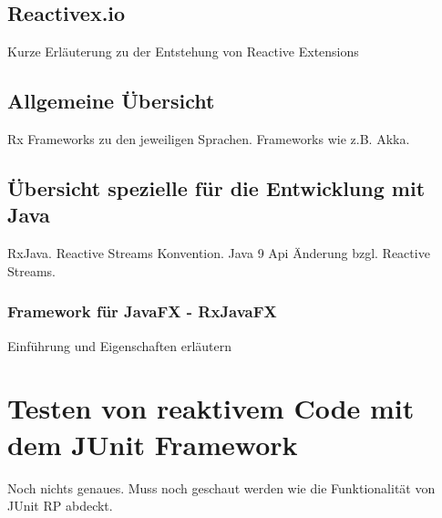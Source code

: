 \subsection{Reactivex.io}
Kurze Erläuterung zu der Entstehung von Reactive Extensions
\subsection{Allgemeine Übersicht}
Rx Frameworks zu den jeweiligen Sprachen. Frameworks wie z.B. Akka. 
\subsection{Übersicht spezielle für die Entwicklung mit Java}
RxJava. Reactive Streams Konvention. Java 9 Api Änderung bzgl. Reactive Streams.
\subsubsection{Framework für JavaFX - RxJavaFX}
Einführung und Eigenschaften erläutern
\section{Testen von reaktivem Code mit dem JUnit Framework}
Noch nichts genaues. Muss noch geschaut werden wie die Funktionalität von JUnit RP abdeckt.